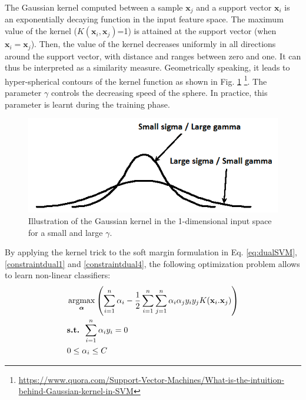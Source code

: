 The Gaussian kernel computed between a sample $\textbf{x}_j$ and a support vector $\textbf{x}_i$ is an exponentially decaying function in the input feature space. The maximum value of the kernel ($K(\textbf{x}_i,\textbf{x}_j)$=1) is attained at the support vector (when $\textbf{x}_i=\textbf{x}_j$). Then, the value of the kernel decreases uniformly in all directions around the support vector, with distance and ranges between zero and one. It can thus be interpreted as a similarity measure. Geometrically speaking, it leads to hyper-spherical contours of the kernel function as shown in Fig. \ref{fig:Kernel_Gaussian} \footnote{\url{https://www.quora.com/Support-Vector-Machines/What-is-the-intuition-behind-Gaussian-kernel-in-SVM}}. The parameter $\gamma$ controls the decreasing speed of the sphere. In practice, this parameter is learnt during the training phase.

\begin{figure}[h!]
\centering
\includegraphics[width=0.6\linewidth]{images/Kernel_Gaussian2}
\caption{Illustration of the Gaussian kernel in the 1-dimensional input space for a small and large $\gamma$.}
\label{fig:Kernel_Gaussian}
\end{figure}


By applying the kernel trick to the soft margin formulation in Eq. \ref{eq:dualSVM}, \ref{constraintdual1} and \ref{constraintdual4}, the following optimization problem allows to learn non-linear classifiers:
\begin{align}
	& \argmax_{\boldsymbol{\alpha}} \left( 
	\sum\limits_{i=1}^{n} \alpha_i - \frac{1}{2} \sum\limits_{i=1}^{n} \sum\limits_{j=1}^{n} \alpha_i \alpha_j y_i y_j K(\textbf{x}_i . \textbf{x}_j) 
	\right) 
	\label{eq:dualSVM2kernel}\\
	& \textbf{s.t. } \sum\limits_{i=1}^{n}\alpha_i y_i = 0 \label{constraintdual3kernel}\\
	& 0 \leq \alpha_i \leq C  \label{constraintdual4kernel}
\end{align}

